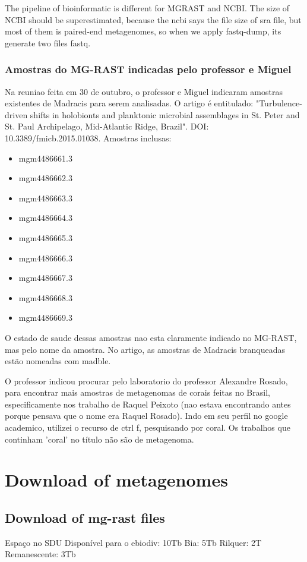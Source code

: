 \documentclass[12pt, a4paper]{report}
\begin{document}
The pipeline of bioinformatic is different for MG\-RAST and NCBI.
The size of NCBI should be superestimated, because the ncbi says the file size of sra file, but most of them is paired-end metagenomes, so when we apply fastq-dump, its generate two files fastq. 

\subsection{Amostras do MG-RAST indicadas pelo professor e Miguel}
Na reuniao feita em 30 de outubro, o professor e Miguel indicaram amostras existentes de Madracis para serem analisadas. O artigo é entitulado: "Turbulence-driven shifts in holobionts and planktonic microbial assemblages in St. Peter and St. Paul Archipelago, Mid-Atlantic Ridge, Brazil". DOI: 10.3389/fmicb.2015.01038. Amostras inclusas: 
\begin{itemize}
\item mgm4486661.3
\item mgm4486662.3
\item mgm4486663.3
\item mgm4486664.3
\item mgm4486665.3
\item mgm4486666.3
\item mgm4486667.3
\item mgm4486668.3
\item mgm4486669.3
\end{itemize}
O estado de saude dessas amostras nao esta claramente indicado no MG-RAST, mas pelo nome da amostra. No artigo, as amostras de Madracis branqueadas estão nomeadas com madble.

O professor indicou procurar pelo laboratorio do professor Alexandre Rosado, para encontrar mais amostras de metagenomas de corais feitas no Brasil, especificamente nos trabalho de Raquel Peixoto (nao estava encontrando antes porque pensava que o nome era Raquel Rosado). Indo em seu perfil no google academico, utilizei o recurso de ctrl f, pesquisando por coral. Os trabalhos que continham 'coral' no título não são de metagenoma. 


\chapter{Download of metagenomes}
\section{Download of mg-rast files} 
Espaço no SDU
Disponível para o ebiodiv: 10Tb
Bia: 5Tb
Rilquer: 2T
Remanescente: 3Tb
\end{document}
